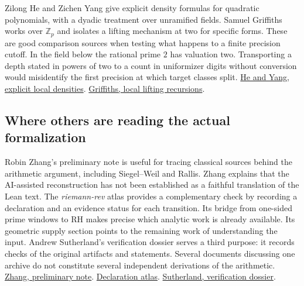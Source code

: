 \documentclass[12pt,letterpaper]{article}
\begin{document}
Zilong He and Zichen Yang give explicit density formulas for quadratic polynomials, with a dyadic treatment over unramified fields. Samuel Griffiths works over $\mathbb Z_p$ and isolates a lifting mechanism at two for specific forms. These are good comparison sources when testing what happens to a finite precision cutoff. In the field below the rational prime $2$ has valuation two. Transporting a depth stated in powers of two to a count in uniformizer digits without conversion would misidentify the first precision at which target classes split.
\href{https://arxiv.org/abs/2407.09076}{He and Yang, explicit local densities}.
\href{https://arxiv.org/abs/2602.21070}{Griffiths, local lifting recursions}.

\subsection{Where others are reading the actual formalization}
Robin Zhang's preliminary note is useful for tracing classical sources behind the arithmetic argument, including Siegel--Weil and Rallis. Zhang explains that the AI-assisted reconstruction has not been established as a faithful translation of the Lean text. The \emph{riemann-rev} atlas provides a complementary check by recording a declaration and an evidence status for each transition. Its bridge from one-sided prime windows to RH makes precise which analytic work is already available. Its geometric supply section points to the remaining work of understanding the input. Andrew Sutherland's verification dossier serves a third purpose: it records checks of the original artifacts and statements. Several documents discussing one archive do not constitute several independent derivations of the arithmetic.
\href{https://www.ihes.fr/~rzhang/files/GRH\%20note.pdf}{Zhang, preliminary note}.
\href{https://nasqret.github.io/riemann-rev/atlas/}{Declaration atlas}.
\href{https://math.mit.edu/~drew/grh/}{Sutherland, verification dossier}.
\end{document}
